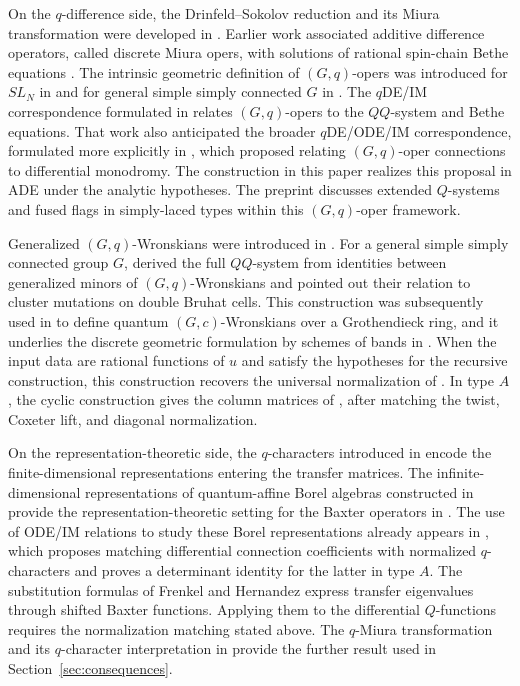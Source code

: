 \documentclass[11pt,leqno]{amsart}
\numberwithin{equation}{section}
\theoremstyle{plain}
\theoremstyle{definition}
\theoremstyle{plain}
\theoremstyle{definition}
\theoremstyle{remark}
\begin{document}
On the $q$-difference side, the Drinfeld--Sokolov reduction and its Miura transformation were developed in \cite{FrenkelReshetikhinSTS1998,SS1998}.  Earlier work associated additive difference operators, called discrete Miura opers, with solutions of rational spin-chain Bethe equations \cite{MukhinVarchenko2005}.  The intrinsic geometric definition of $(G,q)$-opers was introduced for $SL_N$ in \cite{KSZ2021} and for general simple simply connected $G$ in \cite{FKSZ2020}.  The $q$DE/IM correspondence formulated in \cite{FKSZ2020} relates $(G,q)$-opers to the $QQ$-system and Bethe equations.  That work also anticipated the broader $q$DE/ODE/IM correspondence, formulated more explicitly in \cite{KZ2021}, which proposed relating $(G,q)$-oper connections to differential monodromy.  The construction in this paper realizes this proposal in ADE under the analytic hypotheses.  The preprint \cite{ESV2020} discusses extended $Q$-systems and fused flags in simply-laced types within this $(G,q)$-oper framework.

Generalized $(G,q)$-Wronskians were introduced in \cite{KZ2021}.  For a general simple simply connected group $G$, \cite{KZ2021} derived the full $QQ$-system from identities between generalized minors of $(G,q)$-Wronskians and pointed out their relation to cluster mutations on double Bruhat cells.  This construction was subsequently used in \cite{GHL2024} to define quantum $(G,c)$-Wronskians over a Grothendieck ring, and it underlies the discrete geometric formulation by schemes of bands in \cite{FLBands2025,FL2025}.  When the input data are rational functions of $u$ and satisfy the hypotheses for the recursive construction, this construction recovers the universal normalization of \cite{KZ2021}.  In type $A$, the cyclic construction gives the column matrices of \cite{KSZ2021,KZ2021}, after matching the twist, Coxeter lift, and diagonal normalization.

On the representation-theoretic side, the $q$-characters introduced in \cite{FR1998} encode the finite-dimensional representations entering the transfer matrices.  The infinite-dimensional representations of quantum-affine Borel algebras constructed in \cite{HernandezJimbo2012} provide the representation-theoretic setting for the Baxter operators in \cite{FH2015}.  The use of ODE/IM relations to study these Borel representations already appears in \cite{Sun2012}, which proposes matching differential connection coefficients with normalized $q$-characters and proves a determinant identity for the latter in type $A$.  The substitution formulas of Frenkel and Hernandez \cite{FH2015} express transfer eigenvalues through shifted Baxter functions.  Applying them to the differential $Q$-functions requires the normalization matching stated above.  The $q$-Miura transformation and its $q$-character interpretation in \cite{FL2025} provide the further result used in Section~\ref{sec:consequences}.
\end{document}
